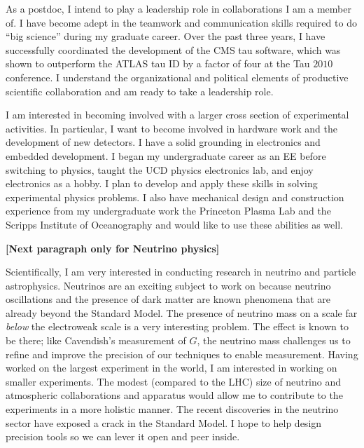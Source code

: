 \documentclass{scrartcl}        %
\begin{document}
\begin{cv}{}
As a postdoc, I intend to play a leadership role in collaborations I am a member
of.  I have become adept in the teamwork and communication skills required to do
``big science'' during my graduate career.  Over the past three years, I have
successfully coordinated the development of the CMS tau software, which was shown to
outperform the ATLAS tau ID by a factor of four at the Tau $2010$ conference.  I
understand the organizational and political elements of productive scientific
collaboration and am ready to take a leadership role.

I am interested in becoming involved with a larger cross section of experimental
activities.  In particular, I want to become involved in hardware work and the
development of new detectors. I have a solid grounding in electronics and
embedded development. I began my undergraduate career as an EE before switching
to physics, taught the UCD physics electronics lab, and enjoy electronics as a
hobby.  I plan to develop and apply these skills in solving experimental physics
problems.  I also have mechanical design and construction experience from my
undergraduate work the Princeton Plasma Lab and the Scripps Institute of
Oceanography and would like to use these abilities as well.

\textbf{[Next paragraph only for Neutrino physics]}

Scientifically, I am very interested in conducting research in neutrino and
particle astrophysics. Neutrinos are an exciting subject to work on because
neutrino oscillations and the presence of dark matter are known phenomena that
are already beyond the Standard Model.  The presence of neutrino mass on a scale
far \emph{below} the electroweak scale is a very interesting problem.  The
effect is known to be there; like Cavendish's measurement of $G$, the neutrino
mass challenges us to refine and improve the precision of our techniques to
enable measurement.  Having worked on the largest experiment in the world, I am
interested in working on smaller experiments.  The modest (compared to the LHC)
size of neutrino and atmospheric collaborations and apparatus would allow me to
contribute to the experiments in a more holistic manner.  The recent discoveries
in the neutrino sector have exposed a crack in the Standard Model. I hope to
help design precision tools so we can lever it open and peer inside.




\end{cv}
\end{document}
